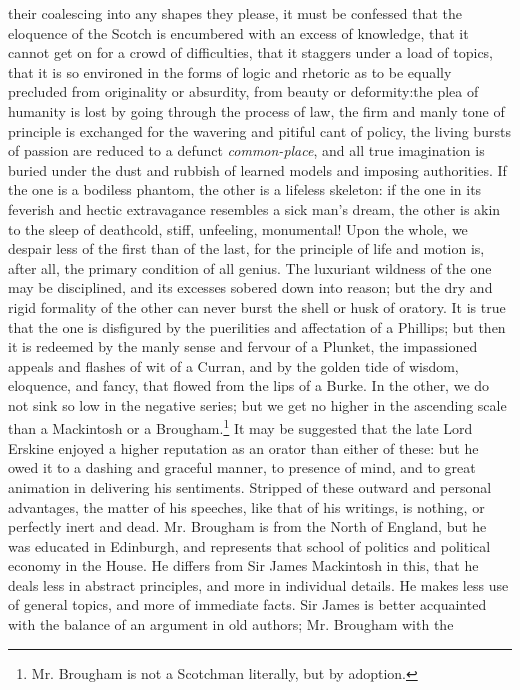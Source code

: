 their coalescing into any shapes they please, it must be confessed
that the eloquence of the Scotch is encumbered with an excess of
knowledge, that it cannot get on for a crowd of difficulties, that
it staggers under a load of topics, that it is so environed in the
forms of logic and rhetoric as to be equally precluded from
originality or absurdity, from beauty or deformity:\textemdash the
plea of humanity is lost by going through the process of law, the
firm and manly tone of principle is exchanged for the wavering and
pitiful cant of policy, the living bursts of passion are reduced
to a defunct \emph{common-place}, and all true imagination is
buried under the dust and rubbish of learned models and imposing
authorities. If the one is a bodiless phantom, the other is a
lifeless skeleton: if the one in its feverish and hectic
extravagance resembles a sick man's dream, the other is akin to
the sleep of death\textemdash cold, stiff, unfeeling, monumental!
Upon the whole, we despair less of the first than of the last, for
the principle of life and motion is, after all, the primary
condition of all genius. The luxuriant wildness of the one may be
disciplined, and its excesses sobered down into reason; but the
dry and rigid formality of the other can never burst the shell or
husk of oratory. It is true that the one is disfigured by the
puerilities and affectation of a Phillips; but then it is redeemed
by the manly sense and fervour of a Plunket, the impassioned
appeals and flashes of wit of a Curran, and by the golden tide of
wisdom, eloquence, and fancy, that flowed from the lips of a
Burke. In the other, we do not sink so low in the negative series;
but we get no higher in the ascending scale than a Mackintosh or a
Brougham.\footnote{ Mr. Brougham is not a Scotchman literally, but
  by adoption.} It may be suggested that the late Lord Erskine
enjoyed a higher reputation as an orator than either of these: but
he owed it to a dashing and graceful manner, to presence of mind,
and to great animation in delivering his sentiments. Stripped of
these outward and personal advantages, the matter of his speeches,
like that of his writings, is nothing, or perfectly inert and
dead. Mr. Brougham is from the North of England, but he was
educated in Edinburgh, and represents that school of politics and
political economy in the House.  He differs from Sir James
Mackintosh in this, that he deals less in abstract principles, and
more in individual details. He makes less use of general topics,
and more of immediate facts. Sir James is better acquainted with
the balance of an argument in old authors; Mr. Brougham with the

